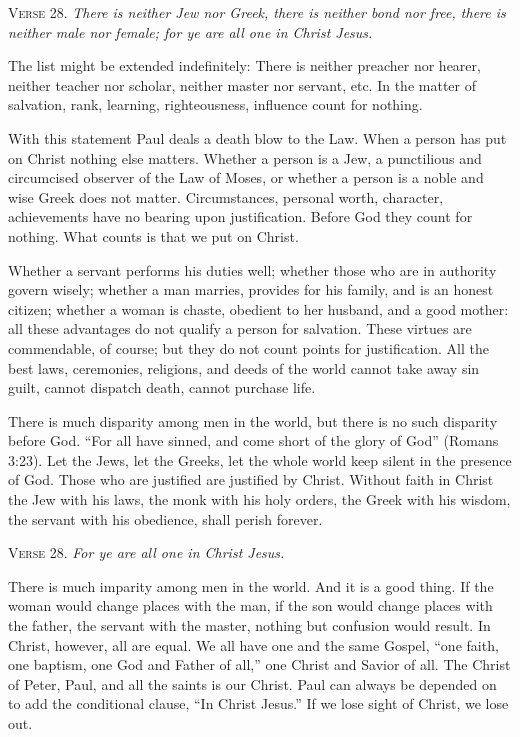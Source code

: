 \textsc{Verse} 28. \emph{There is neither Jew nor Greek, there is neither bond nor free, there is neither male nor female; for ye are all one in Christ Jesus.}

The list might be extended indefinitely: There is neither preacher nor hearer, neither teacher nor scholar, neither master nor servant, etc. In the matter of salvation, rank, learning, righteousness, influence count for nothing.

With this statement Paul deals a death blow to the Law. When a person has put on Christ nothing else matters. Whether a person is a Jew, a punctilious and circumcised observer of the Law of Moses, or whether a person is a noble and wise Greek does not matter. Circumstances, personal worth, character, achievements have no bearing upon justification. Before God they count for nothing. What counts is that we put on Christ.

Whether a servant performs his duties well; whether those who are in authority govern wisely; whether a man marries, provides for his family, and is an honest citizen; whether a woman is chaste, obedient to her husband, and a good mother: all these advantages do not qualify a person for salvation. These virtues are commendable, of course; but they do not count points for justification. All the best laws, ceremonies, religions, and deeds of the world cannot take away sin guilt, cannot dispatch death, cannot purchase life.

There is much disparity among men in the world, but there is no such disparity before God. “For all have sinned, and come short of the glory of God” (Romans 3:23). Let the Jews, let the Greeks, let the whole world keep silent in the presence of God. Those who are justified are justified by Christ. Without faith in Christ the Jew with his laws, the monk with his holy orders, the Greek with his wisdom, the servant with his obedience, shall perish forever.

\textsc{Verse} 28. \emph{For ye are all one in Christ Jesus.}

There is much imparity among men in the world. And it is a good thing. If the woman would change places with the man, if the son would change places with the father, the servant with the master, nothing but confusion would result. In Christ, however, all are equal. We all have one and the same Gospel, “one faith, one baptism, one God and Father of all,” one Christ and Savior of all. The Christ of Peter, Paul, and all the saints is our Christ. Paul can always be depended on to add the conditional clause, “In Christ Jesus.” If we lose sight of Christ, we lose out.


